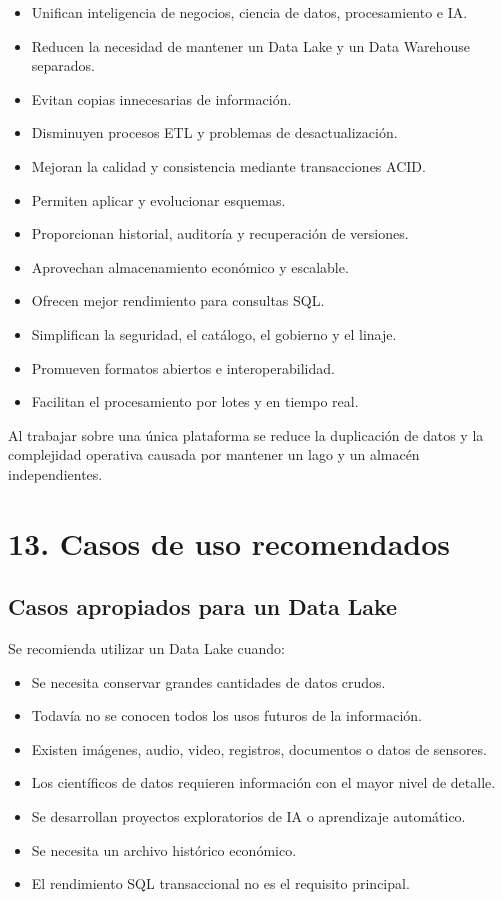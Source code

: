 \begin{itemize}
    \item Unifican inteligencia de negocios, ciencia de datos, procesamiento e IA.
    \item Reducen la necesidad de mantener un Data Lake y un Data Warehouse separados.
    \item Evitan copias innecesarias de información.
    \item Disminuyen procesos ETL y problemas de desactualización.
    \item Mejoran la calidad y consistencia mediante transacciones ACID.
    \item Permiten aplicar y evolucionar esquemas.
    \item Proporcionan historial, auditoría y recuperación de versiones.
    \item Aprovechan almacenamiento económico y escalable.
    \item Ofrecen mejor rendimiento para consultas SQL.
    \item Simplifican la seguridad, el catálogo, el gobierno y el linaje.
    \item Promueven formatos abiertos e interoperabilidad.
    \item Facilitan el procesamiento por lotes y en tiempo real.
\end{itemize}

Al trabajar sobre una única plataforma se reduce la duplicación de datos y la
complejidad operativa causada por mantener un lago y un almacén independientes.

\section*{13. Casos de uso recomendados}

\subsection*{Casos apropiados para un Data Lake}

Se recomienda utilizar un Data Lake cuando:

\begin{itemize}
    \item Se necesita conservar grandes cantidades de datos crudos.
    \item Todavía no se conocen todos los usos futuros de la información.
    \item Existen imágenes, audio, video, registros, documentos o datos de sensores.
    \item Los científicos de datos requieren información con el mayor nivel de detalle.
    \item Se desarrollan proyectos exploratorios de IA o aprendizaje automático.
    \item Se necesita un archivo histórico económico.
    \item El rendimiento SQL transaccional no es el requisito principal.
\end{itemize}


